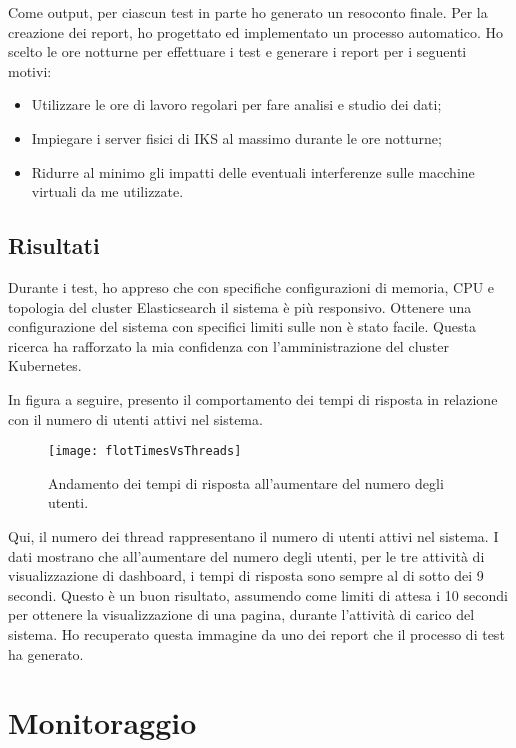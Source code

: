 Come output, per ciascun test in parte ho generato un resoconto finale.
Per la creazione dei report, ho progettato ed implementato un processo automatico.
Ho scelto le ore notturne per effettuare i test e generare i report per i seguenti
motivi: 
\begin{itemize}
	\item Utilizzare le ore di lavoro regolari per fare analisi e studio dei dati;
	\item Impiegare i server fisici di IKS al massimo durante le ore notturne;
	\item Ridurre al minimo gli impatti delle eventuali interferenze sulle macchine 
	      virtuali da me utilizzate.  
\end{itemize}


\subsection{Risultati}
Durante i test, ho appreso che con specifiche configurazioni di memoria, CPU e 
topologia del cluster Elasticsearch il sistema è più responsivo. 
Ottenere una configurazione del sistema con specifici limiti sulle
non è stato facile. Questa ricerca ha rafforzato la mia confidenza 
con l'amministrazione del cluster Kubernetes.
 
In figura a seguire, presento il comportamento dei tempi di risposta in 
relazione con il numero di utenti attivi nel sistema. 

\begin{figure}[htbp]
	\begin{center}
		\texttt{[image: flotTimesVsThreads]}
		\caption{Andamento dei tempi di risposta all'aumentare del numero degli utenti.}
	\end{center}
\end{figure}

Qui, il numero dei thread rappresentano il numero di utenti attivi nel sistema. 
I dati mostrano che all'aumentare del numero degli utenti, per le tre 
attività di visualizzazione di dashboard, i tempi di risposta sono 
sempre al di sotto dei 9 secondi. Questo è un buon risultato, assumendo 
come limiti di attesa i 10 secondi per ottenere la visualizzazione di una 
pagina, durante l'attività di carico del sistema. Ho recuperato
questa immagine da uno dei report che il processo di test ha generato.

\newpage
\section{Monitoraggio}

